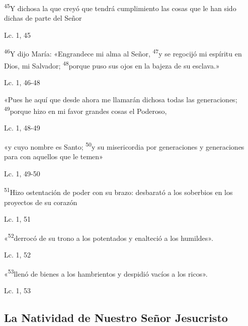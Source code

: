 \documentclass[a4paper,11pt]{article}
\begin{document}
      \textsuperscript{45}Y dichosa la que creyó que tendrá cumplimiento las cosas que le han sido dichas de parte del Señor
      \begin{flushright}
        Lc. 1, 45         
      \end{flushright}
      
      \textsuperscript{46}Y dijo María: «Engrandece mi alma al Señor, \textsuperscript{47}y se regocijó mi espíritu en Dios, mi Salvador;
      \textsuperscript{48}porque puso sus ojos en la bajeza de su esclava.»
      \begin{flushright}
        Lc. 1, 46-48        
      \end{flushright}

      «Pues he aquí que desde ahora me llamarán dichosa todas las generaciones; \textsuperscript{49}porque hizo en mi favor grandes cosas el Poderoso,
      \begin{flushright}
        Lc. 1, 48-49          
      \end{flushright}
      
      «y cuyo nombre es Santo; \textsuperscript{50}y su misericordia por generaciones y generaciones para con aquellos que le temen»
      \begin{flushright}
        Lc. 1, 49-50          
      \end{flushright}
      
      \textsuperscript{51}Hizo ostentación de poder con su brazo: desbarató a los soberbios en los proyectos de su corazón
      \begin{flushright}
        Lc. 1, 51        
      \end{flushright}
      
      «\textsuperscript{52}derrocó de su trono a los potentados y enalteció a los humildes».
      \begin{flushright}
        Lc. 1, 52       
      \end{flushright}
      
      «\textsuperscript{53}llenó de bienes a los hambrientos y despidió vacíos a los ricos».
      \begin{flushright}
        Lc. 1, 53
      \end{flushright}
            
    \subsection*{\hfil La Natividad de Nuestro Señor Jesucristo \hfil}
      
\end{document}
